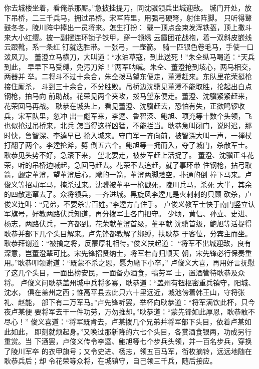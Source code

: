 你去城楼坐着，看俺杀那厮。”急披挂提刀，同沈骥领兵出城迎敌。
城门开处，放下吊桥，二三千兵马，拥过吊桥。宋军阵里，用强弓硬弩，射住阵脚。
只听得鼙鼓冬冬，陵川阵中捧出一员将来。怎生打扮：
戴一顶点金束发浑铁盔，顶上撒斗来大小红缨。披一副摆连环锁子铁甲，穿一领绣
云霞团花战袍，着一双斜皮嵌线云跟靴，系一条红钉就迭胜带。一张弓，一壶箭。
骑一匹银色卷毛马，手使一口泼风刀。
董澄立马横刀，大叫道：“水泊草寇，到此送死！”朱仝纵马喝道：“天兵到此，
早早下马受缚，免污刀斧！”两军呐喊。朱仝、董澄抢到垓心，两马相交，两器并
举。二将斗不过十余合，朱仝拨马望东便走，董澄赶来。东队里花荣挺枪接住厮杀，
斗到三十余合，不分胜败。吊桥边沈骥见董澄不能取胜，抡起出白点钢枪，拍马向
前助战。花荣见两个夹攻，拨马望东便走。董澄、沈骥紧紧赶来，花荣回马再战。
耿恭在城头上，看见董澄、沈骥赶去，恐怕有失，正欲鸣锣收兵，宋军队里，忽冲
出一彪军来，李逵、鲁智深、鲍旭、项充等十数个头领，飞也似抢过吊桥来，北兵
怎当得这样凶猛，不能拦当。耿恭急叫闭门，说时迟，那时快，鲁智深、李逵早已
抢入城来。守门军一齐向前，被智深大叫一声，一禅杖打翻了两个。李逵抡斧，劈
倒五六个。鲍旭等一拥而入，夺了城门，杀散军士。耿恭见头势不好，急滚下来，
望北要走，被步军赶上活捉了。
董澄、沈骥正斗花荣，听的吊桥边喊起，急回马赶去。花荣不去追赶，就了事环带
住钢枪，拈弓取箭，觑定董澄，望董澄后心，飕的一箭，董澄两脚蹬空，扑通的倒
撞下马来。卢俊义等招动军马，掩杀过来。沈骥被董平一枪戳死，陵川兵马，杀死
大半，其余的四散逃窜去了。众将领兵，一齐进城。黑旋风李逵兀是火剌剌的只顾
砍杀，卢俊义连叫：“兄弟，不要杀害百姓。”李逵方肯住手。
卢俊义教军士快于南门竖立认军旗号，好教两路伏兵知道，再分拨军士各门把守。
少顷，黄信、孙立、史进、杨志，两路伏兵，一齐都到。花荣献董澄首级，董平献
沈骥首级，鲍旭等活捉得耿恭并部下几个头目解来。卢先锋都教解了绑缚，扶耿恭
于客位，分宾主而坐。耿恭拜谢道：“被擒之将，反蒙厚礼相待。”俊义扶起道：
“将军不出城迎敌，良有深意，岂董澄辈可比。宋先锋招贤纳士，将军若肯归顺天
朝，宋先锋必行保奏重用。”耿恭叩领谢道：“既蒙不杀之恩，愿为麾下小卒。”
卢俊义大喜，再用好言抚慰了这几个头目，一面出榜安民，一面备办酒食，犒劳军
士，置酒管待耿恭及众将。
卢俊义问耿恭盖州城中兵将多寡，耿恭道：“盖州有钮枢密重兵镇守，阳城、沈水，
俱在盖州之西；惟高平县去此只六十里远近，城池傍着韩王山，守将张礼、赵能，
部下有二万军马。”卢先锋听罢，举杯向耿恭道：“将军满饮此杯，只今夜卢某便
要将军去干一件功劳，万勿推却。”耿恭道：“蒙先锋如此厚恩，耿恭敢不尽心！”
俊义喜道：“将军既肯去，卢某拨几个兄弟并将军部下头目，依着卢某如此如此，
即刻就烦起身。”又唤过那新降的六七个头目，各赏酒食银两，功成另行重赏。当
下酒罢，卢俊义传令李逵、鲍旭等七个步兵头领，并一百名步兵，穿换了陵川军卒
的衣甲旗号；又令史进、杨志，领五百马军，衔枚摘铃，远远地随在耿恭兵后；却
令花荣等众将，在城镇守，自己领三千兵，随后接应。
